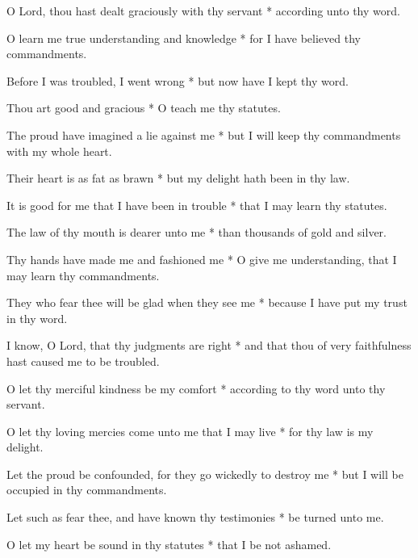 O Lord, thou hast dealt graciously with thy servant * according unto thy word.

O learn me true understanding and knowledge * for I have believed thy commandments.

Before I was troubled, I went wrong * but now have I kept thy word.

Thou art good and gracious * O teach me thy statutes.

The proud have imagined a lie against me * but I will keep thy commandments with my whole heart.

Their heart is as fat as brawn * but my delight hath been in thy law.

It is good for me that I have been in trouble * that I may learn thy statutes.

The law of thy mouth is dearer unto me * than thousands of gold and silver.

Thy hands have made me and fashioned me * O give me understanding, that I may learn thy commandments.

They who fear thee will be glad when they see me * because I have put my trust in thy word.

I know, O Lord, that thy judgments are right * and that thou of very faithfulness hast caused me to be troubled.

O let thy merciful kindness be my comfort * according to thy word unto thy servant.

O let thy loving mercies come unto me that I may live * for thy law is my delight.

Let the proud be confounded, for they go wickedly to destroy me * but I will be occupied in thy commandments.

Let such as fear thee, and have known thy testimonies * be turned unto me.

O let my heart be sound in thy statutes * that I be not ashamed.